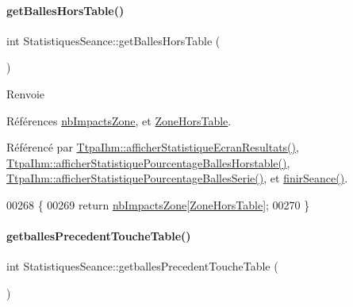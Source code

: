 \paragraph{\texorpdfstring{get\+Balles\+Hors\+Table()}{getBallesHorsTable()}}
{\footnotesize\ttfamily int Statistiques\+Seance\+::get\+Balles\+Hors\+Table (\begin{DoxyParamCaption}{ }\end{DoxyParamCaption})}

\begin{DoxyReturn}{Renvoie}

\end{DoxyReturn}


Références \hyperlink{class_statistiques_seance_aa4a040cda282d5b1c250025f8e191e20}{nb\+Impacts\+Zone}, et \hyperlink{class_statistiques_seance_aa839f5192cbadd7c3fb3651d62eff8b5aeb6ef225df9153e1f46a968ae71bf2f3}{Zone\+Hors\+Table}.



Référencé par \hyperlink{class_ttpa_ihm_aa480a02532144d0f99af027b5b201ae1}{Ttpa\+Ihm\+::afficher\+Statistique\+Ecran\+Resultats()}, \hyperlink{class_ttpa_ihm_a58058063eb377b4c4c48048e4bf84e77}{Ttpa\+Ihm\+::afficher\+Statistique\+Pourcentage\+Balles\+Horstable()}, \hyperlink{class_ttpa_ihm_aec988dc2398578eb8e91563d1ba58cde}{Ttpa\+Ihm\+::afficher\+Statistique\+Pourcentage\+Balles\+Serie()}, et \hyperlink{class_statistiques_seance_a72526ea18d6c534a1cb84576ef3ea28d}{finir\+Seance()}.


\begin{DoxyCode}
00268 \{
00269     \textcolor{keywordflow}{return} \hyperlink{class_statistiques_seance_aa4a040cda282d5b1c250025f8e191e20}{nbImpactsZone}[\hyperlink{class_statistiques_seance_aa839f5192cbadd7c3fb3651d62eff8b5aeb6ef225df9153e1f46a968ae71bf2f3}{ZoneHorsTable}];
00270 \}
\end{DoxyCode}
\mbox{\label{class_statistiques_seance_a4f0dc4fd1c97787dab03ae5074fb3414}} 
\paragraph{\texorpdfstring{getballes\+Precedent\+Touche\+Table()}{getballesPrecedentToucheTable()}}
{\footnotesize\ttfamily int Statistiques\+Seance\+::getballes\+Precedent\+Touche\+Table (\begin{DoxyParamCaption}{ }\end{DoxyParamCaption})}

